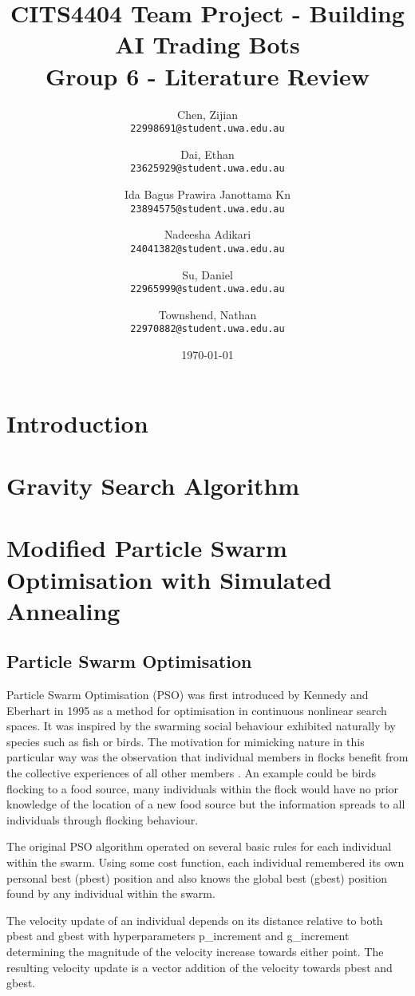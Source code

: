 \documentclass[a4paper, 12pt]{extarticle}
\title{
    CITS4404 Team Project - Building AI Trading Bots
    \\ \large Group 6 - Literature Review
}
\author{
    Chen, Zijian\\
    \normalsize \texttt{22998691@student.uwa.edu.au}
    \and
    Dai, Ethan\\
    \normalsize \texttt{23625929@student.uwa.edu.au}
    \and
    Ida Bagus Prawira Janottama Kn\\
    \normalsize \texttt{23894575@student.uwa.edu.au}
    \and
    Nadeesha Adikari\\
    \normalsize \texttt{24041382@student.uwa.edu.au}
    \and
    Su, Daniel\\
    \normalsize \texttt{22965999@student.uwa.edu.au}
    \and
    Townshend, Nathan\\
    \normalsize \texttt{22970882@student.uwa.edu.au}
}
\date{\today}
\begin{document}
\clearpage

\maketitle


\newpage
\tableofcontents


\newpage
\section{Introduction}\label{sec:intro}
% 


\newpage
\section{Gravity Search Algorithm}\label{sec:alg:gsa}


\newpage
\section{Modified Particle Swarm Optimisation with Simulated Annealing}

\subsection{Particle Swarm Optimisation}

Particle Swarm Optimisation (PSO) was first introduced by Kennedy and Eberhart \cite{kennedy1995particle} in 1995 as a method for optimisation in continuous nonlinear search spaces. It was inspired by the swarming social behaviour exhibited naturally by species such as fish or birds. The motivation for mimicking nature in this particular way was the observation that individual members in flocks benefit from the collective experiences of all other members \cite{wilson2000sociobiology}. An example could be birds flocking to a food source, many individuals within the flock would have no prior knowledge of the location of a new food source but the information spreads to all individuals through flocking behaviour. 

The original PSO algorithm operated on several basic rules for each individual within the swarm. Using some cost function, each individual remembered its own personal best (pbest) position and also knows the global best (gbest) position found by any individual within the swarm.

The velocity update of an individual depends on its distance relative to both pbest and gbest with hyperparameters p\_increment and g\_increment determining the magnitude of the velocity increase towards either point. The resulting velocity update is a vector addition of the velocity towards pbest and gbest.
\end{document}
